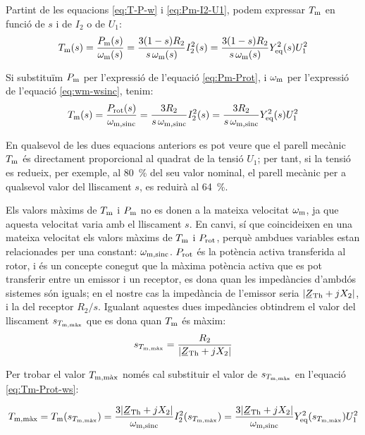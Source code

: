 Partint de les equacions \eqref{eq:T-P-w} i \eqref{eq:Pm-I2-U1}, podem expressar  $T_\mathrm{m}$ en funció de $s$ i de $I_2$ o de $U_1$:
\begin{equation}
    T_\mathrm{m}(s)  =  \frac{P_\mathrm{m}(s)}{\omega_\mathrm{m}(s)} =  \frac{3(1-s) R_2}{s\,\omega_\mathrm{m}(s)} I_2^2(s) =
     \frac{3(1-s) R_2}{s\,\omega_\mathrm{m}(s)} Y_\mathrm{eq}^2(s) U_1^2
\end{equation}

Si substituïm $P_\mathrm{m}$ per l'expressió de l'equació \eqref{eq:Pm-Prot}, i $\omega_\mathrm{m}$ per l'expressió de l'equació \eqref{eq:wm-wsinc}, tenim:
\begin{equation}\index{motors d'inducció!parell mecànic}
    T\ped{m}(s)  =  \frac{P\ped{rot}(s)}{\omega\ped{m,sinc}} =   \frac{3 R_2}{s\,\omega\ped{m,sinc}} I_2^2(s) =
     \frac{3 R_2}{s\,\omega\ped{m,sinc}} Y\ped{eq}^2(s) U_1^2 \label{eq:Tm-Prot-ws}
\end{equation}

En qualsevol de les dues equacions anteriors es pot veure que el parell mecànic $T_\mathrm{m}$ és directament proporcional al quadrat de la tensió $U_1$; per tant, si la tensió es redueix, per exemple, al \qty{80}{\%} del seu valor nominal, el parell mecànic per a qualsevol valor del lliscament $s$,  es reduirà al \qty{64}{\%}.

Els valors màxims de $T_\mathrm{m}$ i $P_\mathrm{m}$ no es donen a la mateixa velocitat  $\omega_\mathrm{m}$, ja que aquesta velocitat varia amb el lliscament $s$. En canvi, sí que coincideixen en una mateixa velocitat els valors  màxims de $T_\mathrm{m}$ i $P_\mathrm{rot}$, perquè ambdues variables estan relacionades per una constant: $\omega_\mathrm{m,sinc}$. $P_\mathrm{rot}$ és la potència activa transferida al rotor, i és un concepte conegut que la màxima potència activa  que es pot transferir entre un emissor i un receptor, es dona quan les impedàncies d'ambdós sistemes són iguals; en el nostre cas la impedància de l'emissor seria $|\cmplx{Z}\ped{Th} + j X_2|$, i la del receptor $R_2/s$. Igualant aquestes dues impedàncies obtindrem el valor del lliscament $s_{T_\mathrm{m,\text{màx}}}$ que es dona quan $T_\mathrm{m}$ és màxim:
\begin{equation}
    s_{T\ped{m,\text{màx}}} =  \frac{R_2}{|\cmplx{Z}\ped{Th} + j X_2|} \label{eq:s-T-max}
\end{equation}

Per trobar el valor  $T_\mathrm{m,\text{màx}}$ només cal substituir el valor de $s_{T_\mathrm{m,\text{màx}}}$ en l'equació \eqref{eq:Tm-Prot-ws}:

\begin{equation}
    T\ped{m,\text{màx}}  =  T\ped{m}(s_{T\ped{m,\text{màx}}}) =  \frac{3 |\cmplx{Z}\ped{Th} + j X_2|}{\omega\ped{m,sinc}} I_2^2(s_{T\ped{m,\text{màx}}}) = \frac{3 |\cmplx{Z}\ped{Th} + j X_2|}{\omega\ped{m,sinc}} Y\ped{eq}^2(s_{T\ped{m,\text{màx}}}) U_1^2
\end{equation}


